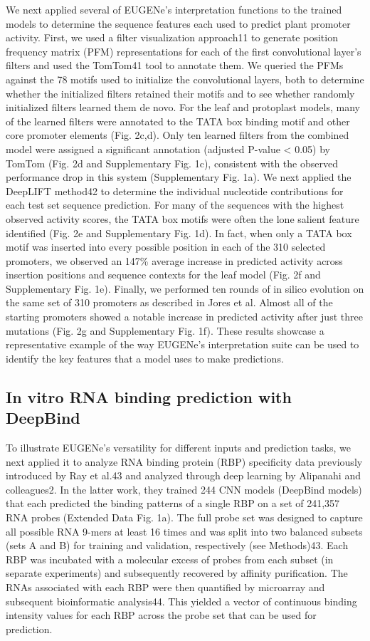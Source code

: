 We next applied several of EUGENe’s interpretation functions to the trained models to determine the sequence features each used to predict plant promoter activity. First, we used a filter visualization approach11 to generate position frequency matrix (PFM) representations for each of the first convolutional layer’s filters and used the TomTom41 tool to annotate them. We queried the PFMs against the 78 motifs used to initialize the convolutional layers, both to determine whether the initialized filters retained their motifs and to see whether randomly initialized filters learned them de novo. For the leaf and protoplast models, many of the learned filters were annotated to the TATA box binding motif and other core promoter elements (Fig. 2c,d). Only ten learned filters from the combined model were assigned a significant annotation (adjusted P-value < 0.05) by TomTom (Fig. 2d and Supplementary Fig. 1c), consistent with the observed performance drop in this system (Supplementary Fig. 1a). We next applied the DeepLIFT method42 to determine the individual nucleotide contributions for each test set sequence prediction. For many of the sequences with the highest observed activity scores, the TATA box motifs were often the lone salient feature identified (Fig. 2e and Supplementary Fig. 1d). In fact, when only a TATA box motif was inserted into every possible position in each of the 310 selected promoters, we observed an 147\% average increase in predicted activity across insertion positions and sequence contexts for the leaf model (Fig. 2f and Supplementary Fig. 1e). Finally, we performed ten rounds of in silico evolution on the same set of 310 promoters as described in Jores et al. Almost all of the starting promoters showed a notable increase in predicted activity after just three mutations (Fig. 2g and Supplementary Fig. 1f). These results showcase a representative example of the way EUGENe’s interpretation suite can be used to identify the key features that a model uses to make predictions.

\subsection{In vitro RNA binding prediction with DeepBind}

To illustrate EUGENe’s versatility for different inputs and prediction tasks, we next applied it to analyze RNA binding protein (RBP) specificity data previously introduced by Ray et al.43 and analyzed through deep learning by Alipanahi and colleagues2. In the latter work, they trained 244 CNN models (DeepBind models) that each predicted the binding patterns of a single RBP on a set of 241,357 RNA probes (Extended Data Fig. 1a). The full probe set was designed to capture all possible RNA 9-mers at least 16 times and was split into two balanced subsets (sets A and B) for training and validation, respectively (see Methods)43. Each RBP was incubated with a molecular excess of probes from each subset (in separate experiments) and subsequently recovered by affinity purification. The RNAs associated with each RBP were then quantified by microarray and subsequent bioinformatic analysis44. This yielded a vector of continuous binding intensity values for each RBP across the probe set that can be used for prediction.

